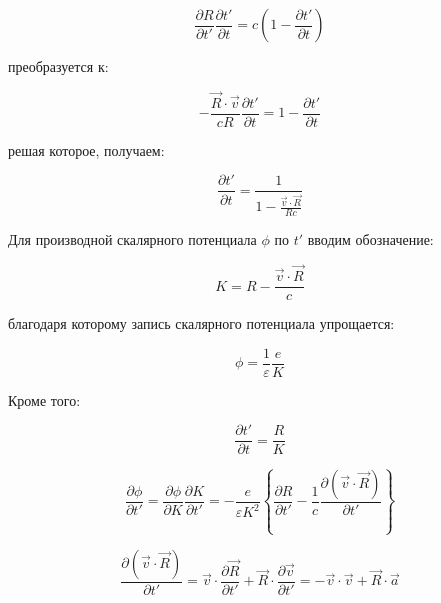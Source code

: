 \documentclass[12pt, a4paper]{article}
\begin{document}
\begin{equation}
\frac{\partial R}{\partial t'} \frac{\partial t'}{\partial t} = c \left( 1 - \frac{\partial t'}{\partial t} \right)
\label{eq:R_chain}
\end{equation}

преобразуется к:

\begin{equation}
-\frac{\vec{R} \cdot \vec{v}}{cR} \frac{\partial t'}{\partial t} = 1 - \frac{\partial t'}{\partial t}
\label{eq:R_chain_expanded}
\end{equation}

решая которое, получаем:

\begin{equation}
\frac{\partial t'}{\partial t} = \frac{1}{1 - \frac{\vec{v} \cdot \vec{R}}{Rc}}
\label{eq:t_prime_solution}
\end{equation}

Для производной скалярного потенциала $\phi$ по $t'$ вводим обозначение:

\begin{equation}
K = R - \frac{\vec{v} \cdot \vec{R}}{c}
\label{eq:K_definition}
\end{equation}

благодаря которому запись скалярного потенциала упрощается:

\begin{equation}
\phi = \frac{1}{\varepsilon} \frac{e}{K}
\label{eq:phi_K}
\end{equation}

Кроме того:

\begin{equation}
\frac{\partial t'}{\partial t} = \frac{R}{K}
\label{eq:t_prime_K}
\end{equation}

\begin{equation}
\frac{\partial \phi}{\partial t'} = \frac{\partial \phi}{\partial K} \frac{\partial K}{\partial t'} = -\frac{e}{\varepsilon K^2} \left\{ \frac{\partial R}{\partial t'} - \frac{1}{c} \frac{\partial (\vec{v} \cdot \vec{R})}{\partial t'} \right\}
\label{eq:phi_K_derivative}
\end{equation}

\begin{equation}
\frac{\partial (\vec{v} \cdot \vec{R})}{\partial t'} = \vec{v} \cdot \frac{\partial \vec{R}}{\partial t'} + \vec{R} \cdot \frac{\partial \vec{v}}{\partial t'} = -\vec{v} \cdot \vec{v} + \vec{R} \cdot \vec{a}
\label{eq:vR_derivative}
\end{equation}
\end{document}
